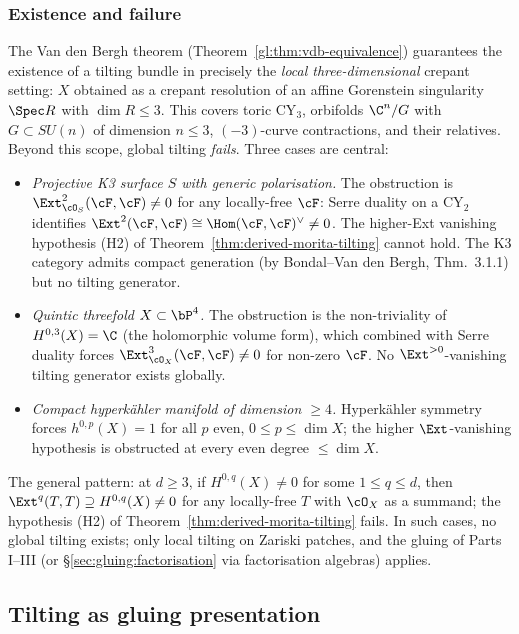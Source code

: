 \subsubsection{Existence and failure}

The Van den Bergh theorem (Theorem~\ref{gl:thm:vdb-equivalence}) guarantees the
existence of a tilting bundle in precisely the \emph{local three-dimensional}
crepant setting: $X$ obtained as a crepant resolution of an affine Gorenstein
singularity $\Spec R$ with $\dim R \leq 3$. This covers toric CY$_3$,
orbifolds $\C^n/G$ with $G \subset SU(n)$ of dimension $n \leq 3$,
$(-3)$-curve contractions, and their relatives. Beyond this scope, global
tilting \emph{fails}. Three cases are central:
\begin{itemize}
\item[(a)] \emph{Projective K3 surface $S$ with generic polarisation.} The
obstruction is $\Ext^{2}_{\cO_S}(\cF, \cF) \neq 0$ for any locally-free $\cF$:
Serre duality on a CY$_2$ identifies
$\Ext^2(\cF, \cF) \cong \Hom(\cF, \cF)^{\vee} \neq 0$. The higher-Ext vanishing
hypothesis (H2) of Theorem~\ref{thm:derived-morita-tilting} cannot hold. The
K3 category admits compact generation (by Bondal--Van den Bergh, Thm.~3.1.1)
but no tilting generator.
\item[(b)] \emph{Quintic threefold $X \subset \bP^4$.} The obstruction is the
non-triviality of $H^{0,3}(X) = \C$ (the holomorphic volume form), which
combined with Serre duality forces $\Ext^3_{\cO_X}(\cF, \cF) \neq 0$ for
non-zero $\cF$. No $\Ext^{>0}$-vanishing tilting generator exists globally.
\item[(c)] \emph{Compact hyperk\"ahler manifold of dimension $\geq 4$.}
Hyperk\"ahler symmetry forces $h^{0,p}(X) = 1$ for all $p$ even, $0 \leq p \leq
\dim X$; the higher $\Ext$-vanishing hypothesis is obstructed at every even
degree $\leq \dim X$.
\end{itemize}
The general pattern: at $d \geq 3$, if $H^{0,q}(X) \neq 0$ for some $1 \leq q
\leq d$, then $\Ext^q(T, T) \supseteq H^{0,q}(X) \neq 0$ for any
locally-free $T$ with $\cO_X$ as a summand; the hypothesis (H2) of
Theorem~\ref{thm:derived-morita-tilting} fails. In such cases, no global
tilting exists; only local tilting on Zariski patches, and the gluing of
Parts I--III (or \S\ref{sec:gluing:factorisation} via factorisation algebras) applies.

\subsection{Tilting as gluing presentation}
\label{sec:tilting-as-gluing}

